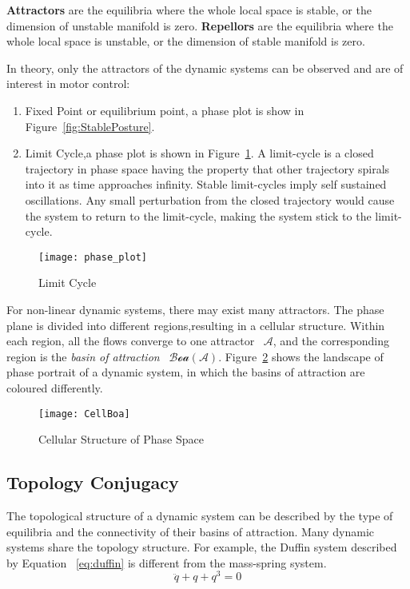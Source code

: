 \textbf{Attractors} are the equilibria where the whole local space is stable, or the dimension of unstable manifold is zero.
\textbf{Repellors} are the equilibria where the whole local space is unstable, or the dimension of stable manifold is zero.







In theory, only the attractors of the dynamic systems can be  observed  and are of interest in motor control:
\begin{enumerate}
 \item Fixed Point or equilibrium point, a phase plot  is show in Figure~\ref{fig:StablePosture}.
 \item Limit Cycle,a phase plot is shown in Figure~\ref{fig:ecycle}.
 A limit-cycle  is a closed trajectory in phase space having the property that other trajectory spirals into it as time approaches infinity.
Stable limit-cycles imply self sustained oscillations. Any small perturbation from the closed trajectory would cause the system to return to the limit-cycle, making the system stick to the limit-cycle.
\end{enumerate}

\begin{figure}
	\begin{center}
	\texttt{[image: phase\_plot]}
	\end{center}
	\caption{Limit Cycle}
	\label{fig:ecycle}
\end{figure}





For non-linear dynamic systems, there may exist many attractors.
The phase plane is divided into different regions,resulting in a cellular structure.
Within each region, all the flows converge to one attractor ~$\mathcal{A}$,
and the corresponding region is  the \emph{basin of attraction} ~$\mathcal{Boa}(\mathcal{A})$.
Figure~\ref{fig:manyboa} shows the landscape of phase portrait of a dynamic system, in which the basins of attraction are coloured differently.
\begin{figure}
\begin{center}
\texttt{[image: CellBoa]}
\end{center}
\caption{Cellular Structure of Phase Space}
\label{fig:manyboa}
\end{figure}




\subsection{Topology Conjugacy}
The topological structure of a dynamic system can be described by the type of equilibria and the connectivity of their basins of attraction.
Many dynamic systems share the topology structure.
For example, the Duffin system described by Equation ~\ref{eq:duffin} is different from the mass-spring system.
\begin{equation}
\label{eq:duffin}
\ddot{q}+q+q^{3}=0
\end{equation}

